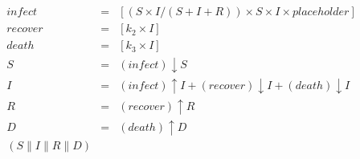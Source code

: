 \begin{eqnarray*}
\mathit{infect} & = & [(S\times I/(S+I+R))\times S\times I\times \mathit{placeholder}]\\%
\mathit{recover} & = & [k_2\times I]\\%
\mathit{death} & = & [k_3\times I]\\%
%
S & = & (\mathit{infect}){\downarrow}S\\%
I & = & (\mathit{infect}){\uparrow}I + (\mathit{recover}){\downarrow}I + (\mathit{death}){\downarrow}I\\%
R & = & (\mathit{recover}){\uparrow}R\\%
D & = & (\mathit{death}){\uparrow}D\\%
%
(S {\parallel} I {\parallel} R {\parallel} D)\end{eqnarray*}
